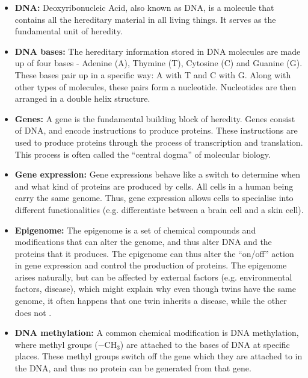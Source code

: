 \documentclass[12pt, twoside, a4paper]{report}
\begin{document}
\begin{itemize}
\item \textbf{DNA:} Deoxyribonucleic Acid, also known as DNA, is a molecule that contains all the hereditary material in all living things. It serves as the fundamental unit of heredity.

\item \textbf{DNA bases:} The hereditary information stored in DNA molecules are made up of four bases - Adenine (A), Thymine (T), Cytosine (C) and Guanine (G). These bases pair up in a specific way: A with T and C with G. Along with other types of molecules, these pairs form a nucleotide. Nucleotides are then arranged in a double helix structure.

\item \textbf{Genes:} A gene is the fundamental building block of heredity. Genes consist of DNA, and encode instructions to produce proteins. These instructions are used to produce proteins through the process of transcription and translation. This process is often called the ``central dogma'' of molecular biology.

\item \textbf{Gene expression:} Gene expressions behave like a switch to determine when and what kind of proteins are produced by cells. All cells in a human being carry the same genome. Thus, gene expression allows cells to specialise into different functionalities (e.g. differentiate between a brain cell and a skin cell).

\item \textbf{Epigenome:} The epigenome is a set of chemical compounds and modifications that can alter the genome, and thus alter DNA and the proteins that it produces. The epigenome can thus alter the ``on/off'' action in gene expression and control the production of proteins. The epigenome arises naturally, but can be affected by external factors (e.g. environmental factors, disease), which might explain why even though twins have the same genome, it often happens that one twin inherits a disease, while the other does not \cite{RefWorks:107}.

\item \textbf{DNA methylation:} A common chemical modification is DNA methylation, where methyl groups ($-$CH$_3$) are attached to the bases of DNA at specific places. These methyl groups switch off the gene which they are attached to in the DNA, and thus no protein can be generated from that gene.
\end{itemize}
\end{document}
